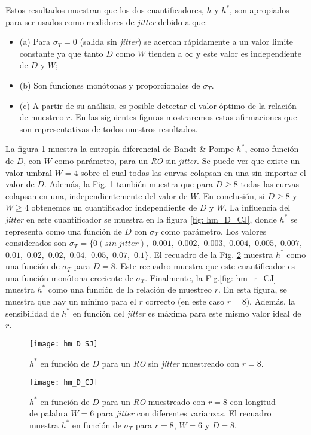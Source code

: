 Estos resultados muestran que los dos cuantificadores, $h$ y $h^*$, son apropiados para ser usados como medidores de \textit{jitter} debido a que: 
\begin{itemize} 
\item (a) Para $\sigma_T=0$ (salida sin \textit{jitter}) se acercan rápidamente a un valor limite constante ya que tanto $D$ como $W$ tienden a $\infty$ y este valor es independiente de $D$ y $W$; 
\item (b) Son funciones monótonas y proporcionales de $\sigma_T$.
\item (c) A partir de su análisis, es posible detectar el valor óptimo de la relación de muestreo $r$.
En las siguientes figuras mostraremos estas afirmaciones que son representativas de todos nuestros resultados.
\end{itemize}
%
La figura \ref{fig:hm_D_SJ} muestra la entropía diferencial de Bandt \& Pompe $h^*$, como función de $D$, con $W$ como parámetro, para un \textit{RO} sin \textit{jitter}.
Se puede ver que existe un valor umbral $W = 4$ sobre el cual todas las curvas colapsan en una sin importar el valor de $D$.
Además, la Fig. \ref{fig:hm_D_SJ} también muestra que para $D \ge 8$ todas las curvas colapsan en una, independientemente del valor de $W$.
En conclusión, si $D \ge 8$ y $W \ge 4$ obtenemos un cuantificador independiente de $D$ y $W$.
La influencia del \textit{jitter} en este cuantificador se muestra en la figura \ref{fig: hm_D_CJ}, donde $h^*$ se representa como una función de $D$ con $\sigma_T$ como parámetro.
Los valores considerados son $\sigma_T=\{0 (sin~jitter),$ $0.001,$ $0.002,$ $0.003,$ $0.004,$ $0.005,$ $0.007,$ $0.01,$ $0.02,$ $0.02,$ $0.04,$ $0.05,$ $0.07,$ $0.1\}$.
El recuadro de la Fig. \ref{fig:hm_D_CJ} muestra $h^*$ como una función de $\sigma_T$ para $D = 8$.
Este recuadro muestra que este cuantificador es una función monótona creciente de $\sigma_T$.
Finalmente, la Fig.\ref{fig: hm_r_CJ} muestra $h^*$ como una función de la relación de muestreo $r$.
En esta figura, se muestra que hay un mínimo para el $r$ correcto (en este caso $r = 8$).
Además, la sensibilidad de $h^*$ en función del \textit{jitter} es máxima para este mismo valor ideal de $r$.

\begin{figure}
\center
\texttt{[image: hm\_D\_SJ]}
\caption{$h^*$ en función de $D$ para un \emph{RO} sin \textit{jitter} muestreado con $r=8$.}
\label{fig:hm_D_SJ}
\end{figure}

\begin{figure}
\center
\texttt{[image: hm\_D\_CJ]}
\caption{$h^*$ en función de $D$ para un \emph{RO} muestreado con $r=8$ con longitud de palabra $W=6$ para \textit{jitter} con diferentes varianzas. El recuadro muestra $h^*$ en función de $\sigma_T$ para $r=8$, $W=6$ y $D=8$.}
\label{fig:hm_D_CJ}
\end{figure}

